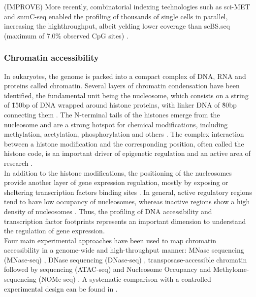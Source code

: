 (IMPROVE) More recently, combinatorial indexing technologies such as sci-MET \cite{Mulqueen2018} and snmC-seq \cite{Luo2018} enabled the profiling of thousands of single cells in parallel, increasing the highthroughput, albeit yelding lower coverage than scBS.seq (maximum of 7.0\% observed CpG sites) \cite{Mulqueen2018}.



\subsubsection{Chromatin accessibility}
In eukaryotes, the genome is packed into a compact complex of DNA, RNA and proteins called chromatin. Several layers of chromatin condensation have been identified, the fundamental unit being the nucleosome, which consists on a string of \~150bp of DNA wrapped around histone proteins, with linker DNA of \~80bp connecting them \cite{Klemm2019,Tsompana2014}. The N-terminal tails of the histones emerge from the nucleosome and are a strong hotspot for chemical modifications, including methylation, acetylation, phosphorylation and others \cite{Bannister2011}. The complex interaction between a histone modification and the corresponding position, often called the histone code, is an important driver of epigenetic regulation and an active area of research \cite{Zhao2015}. \\
In addition to the histone modifications, the positioning of the nucleosomes provide another layer of gene expression regulation, mostly by exposing or sheltering transcription factors binding sites \cite{Jiang2009}. In general, active regulatory regions tend to have low occupancy of nucleosomes, whereas inactive regions show a high density of nucleosomes \cite{Struhl2013}. Thus, the profiling of DNA accessibility and transcription factor footprints represents an important dimension to understand the regulation of gene expression.\\

Four main experimental approaches have been used to map chromatin accessibility in a genome-wide and high-throughput manner: MNase sequencing (MNase-seq) \cite{Kaplan2008}, DNase sequencing (DNase-seq) \cite{Song2010}, transposase-accessible chromatin followed by sequencing (ATAC-seq) \cite{Buenrostro2013} and Nucleosome Occupancy and Methylome-sequencing (NOMe-seq) \cite{Kelly2012}. A systematic comparison with a controlled experimental design can be found in \cite{Nordstrom2019}.

